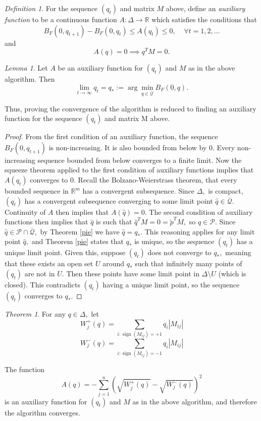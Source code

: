\documentclass[BSc]{usydthesis}
\numberwithin{equation}{chapter}
\theoremstyle{remark}
\newtheorem{Definition}[equation]{Definition}
\newtheorem{Theorem}[equation]{Theorem}
\newtheorem{Lemma}[equation]{Lemma}
\begin{document}
\begin{Definition}
 For the sequence $(q_t)$ and matrix $M$ above, define an {\em auxiliary function} to be a continuous function $A:\Delta \to \mathbb{R}$ which satisfies the conditions that 
$$ B_F(0, q_{t+1}) - B_F(0, q_t) \leq A(q_t) \leq 0, \  \  \ \ \  \forall t=1,2,\ldots$$
and $$A(q) = 0 \implies q^TM = 0.$$
\end{Definition}

\begin{Lemma}
 Let $A$ be an auxiliary function for $(q_t)$ and $M$ as in the above algorithm. Then 
 $$ \lim_{t\to\infty} q_t = q_* := \arg \min_{q\in \overline{\mathcal{Q}}} B_F (0,q).$$
 
 Thus, proving the convergence of the algorithm is reduced to finding an auxiliary function for the sequence $(q_t)$ and matrix M above.
\end{Lemma}

\begin{proof}
 From the first condition of an auxiliary function, the sequence $B_F(0, q_{t+1})$ is non-increasing. It is also bounded from below by $0.$ Every non-increasing sequence bounded from below converges to a finite limit. Now the squeeze theorem applied to the first condition of auxiliary functions implies that $A(q_t)$ converges to $0.$ Recall the Bolzano-Weierstrass theorem, that every bounded sequence in $\mathbb{R}^m$ has a convergent subsequence. Since $\Delta,$ is compact, $(q_t)$ has a convergent subsequence converging to some limit point $\hat{q} \in \overline{\mathcal{Q}}.$ Continuity of $A$ then implies that $A(\hat{q})=0.$ The second condition of auxiliary functions then implies that $\hat{q}$ is such that $\hat{q}^T M = 0 = \tilde{p}^TM,  $ so $q\in \mathcal{P}.$ Since $\hat{q} \in \mathcal{P}\cap \overline{\mathcal{Q}},$ by Theorem \ref{pie} we have $\hat{q} = q_*.$ This reasoning applies for any limit point $\hat{q},$ and Theorem \ref{pie} states that $q_*$ is unique, so the sequence $(q_t)$ has a unique limit point. Given this, suppose $(q_t)$ does not converge to $q_*,$ meaning that these exists an open set $U$ around $q_*$ such that infinitely many points of $(q_t)$ are not in $U.$ Then these points have some limit point in $\Delta\setminus U$ (which is closed). This contradicts $(q_t)$ having a unique limit point, so the sequence $(q_t)$ converges to $q_*.$ 
\end{proof}

\begin{Theorem}
For any $q\in\Delta,$ let $$W^+_j(q) = \sum_{i : \operatorname{sign}(M_{ij}) = +1 } q_i |M_{ij}|$$ $$ W^-_j(q) = \sum_{i : \operatorname{sign}(M_{ij}) = -1 } q_i |M_{ij}|$$

The function $$A(q) = - \sum_{j=1}^n \left( \sqrt{ W^+_j(q)} - \sqrt{ W^-_j(q)}\right)^2$$ is an auxiliary function for $(q_t)$ and $M$ as in the above algorithm, and therefore the algorithm converges. 
\end{Theorem}
\end{document}
